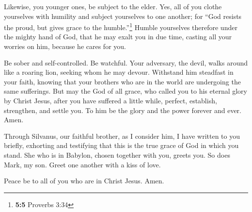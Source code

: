  Likewise, you younger ones, be subject to the elder. Yes,
all of you clothe yourselves with humility and subject yourselves to one
another; for ``God resists the proud, but gives grace to the
humble.''\footnote{\textbf{5:5} Proverbs 3:34}  Humble
yourselves therefore under the mighty hand of God, that he may exalt you
in due time,  casting all your worries on him, because he
cares for you.

 Be sober and self-controlled. Be watchful. Your
adversary, the devil, walks around like a roaring lion, seeking whom he
may devour.  Withstand him steadfast in your faith,
knowing that your brothers who are in the world are undergoing the same
sufferings.  But may the God of all grace, who called you
to his eternal glory by Christ Jesus, after you have suffered a little
while, perfect, establish, strengthen, and settle you. 
To him be the glory and the power forever and ever. Amen.

 Through Silvanus, our faithful brother, as I consider
him, I have written to you briefly, exhorting and testifying that this
is the true grace of God in which you stand.  She who is
in Babylon, chosen together with you, greets you. So does Mark, my son.
 Greet one another with a kiss of love.

Peace be to all of you who are in Christ Jesus. Amen.
